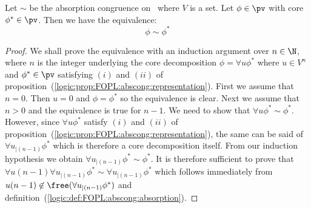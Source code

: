\begin{prop}\label{logic:prop:FOPL:abscong:core:equivalent}
Let $\sim$ be the absorption congruence on \pv\ where $V$ is a set.
Let $\phi\in\pv$ with core $\phi^{*}\in\pv$. Then we have the
equivalence:
    \[
    \phi\sim\phi^{*}
    \]
\end{prop}
\begin{proof}
We shall prove the equivalence with an induction argument over
$n\in\N$, where $n$ is the integer underlying the core decomposition
$\phi=\forall u\phi^{*}$ where $u\in V^{n}$ and $\phi^{*}\in\pv$
satisfying $(i)$ and $(ii)$ of
proposition~(\ref{logic:prop:FOPL:abscong:representation}). First we
assume that $n=0$. Then $u=0$ and $\phi=\phi^{*}$ so the equivalence
is clear. Next we assume that $n>0$ and the equivalence is true for
$n-1$. We need to show that $\forall u\phi^{*}\sim\phi^{*}$.
However, since $\forall u\phi^{*}$ satisfy $(i)$ and $(ii)$ of
proposition~(\ref{logic:prop:FOPL:abscong:representation}), the same
can be said of $\forall u_{|(n-1)}\phi^{*}$ which is therefore a
core decomposition itself. From our induction hypothesis we obtain
$\forall u_{|(n-1)}\phi^{*}\sim\phi^{*}$. It is therefore sufficient
to prove that $\forall u(n-1)\forall u_{|(n-1)}\phi^{*}\sim\forall
u_{|(n-1)}\phi^{*}$ which follows immediately from
$u(n-1)\not\in\free(\forall u_{|(n-1)}\phi^{*})$ and
definition~(\ref{logic:def:FOPL:abscong:absorption}).
\end{proof}


